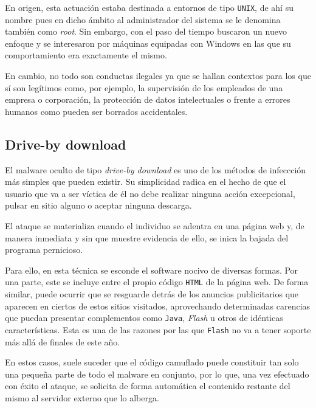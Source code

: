 \documentclass[12pt]{article}
\newcommand{\newpar} {
    \vskip 1cm
}
\begin{document}
            \newpar

            En origen, esta actuación estaba destinada a entornos de tipo \texttt{UNIX}, de ahí su nombre pues en dicho ámbito al administrador del sistema se le denomina también como \textit{root}. Sin embargo, con el paso del tiempo buscaron un nuevo enfoque y se interesaron por máquinas equipadas con Windows en las que su comportamiento era exactamente el mismo.

            \newpar

            En cambio, no todo son conductas ilegales ya que se hallan contextos para los que sí son legítimos como, por ejemplo, la supervisión de los empleados de una empresa o corporación, la protección de datos intelectuales o frente a errores humanos como pueden ser borrados accidentales.

        \subsection{Drive-by download}
            El malware oculto de tipo \textit{drive-by download} es uno de los métodos de infeccción más simples que pueden existir. Su simplicidad radica en el hecho de que el usuario que va a ser víctica de él no debe realizar ninguna acción excepcional, pulsar en sitio alguno o aceptar ninguna descarga.

            \newpar

            El ataque se materializa cuando el individuo se adentra en una página web y, de manera inmediata y sin que muestre evidencia de ello, se inica la bajada del programa pernicioso.

            \newpar

            Para ello, en esta técnica se esconde el software nocivo de diversas formas. Por una parte, este se incluye entre el propio código \texttt{HTML} de la página web. De forma similar, puede ocurrir que se resguarde detrás de los anuncios publicitarios que aparecen en ciertos de estos sitios visitados, aprovechando determinadas carencias que puedan presentar complementos como \texttt{Java}, \textit{Flash} u otros de idénticas características. Esta es una de las razones por las que \texttt{Flash} no va a tener soporte más allá de finales de este año.

            \newpar

            En estos casos, suele suceder que el código camuflado puede constituir tan solo una pequeña parte de todo el malware en conjunto, por lo que, una vez efectuado con éxito el ataque, se solicita de forma automática el contenido restante del mismo al servidor externo que lo alberga.
\end{document}
